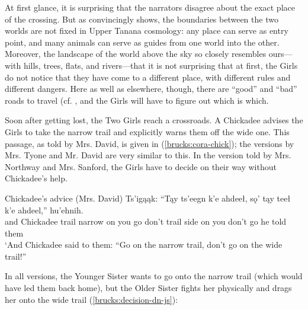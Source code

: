 At first glance, it is surprising that the narrators disagree about the exact place of the crossing. But as \citet[470f.]{GuedonMF2005} convincingly shows, the boundaries between the two worlds are not fixed in Upper Tanana cosmology: any place can serve as entry point, and many animals can serve as guides from one world into the other. Moreover, the landscape of the world above the sky so closely resembles ours—with hills, trees, flats, and rivers—that it is not surprising that at first, the Girls do not notice that they have come to a different place, with different rules and different dangers. Here as well as elsewhere, though, there are ``good'' and ``bad'' roads to travel (cf. \citet[473]{GuedonMF2005}, and the Girls will have to figure out which is which.

Soon after getting lost, the Two Girls reach a crossroads. A Chickadee advises the Girls to take the narrow trail and explicitly warns them off the wide one. This passage, as told by Mrs. David, is given in (\ref{brucks:cora-chick}); the versions by Mrs. Tyone and Mr. David are very similar to this. In the version told by Mrs. Northway and Mrs. Sanford, the Girls have to decide on their way without Chickadee's help.

\begin{exe}
\ex Chickadee's advice (Mrs. David) \label{brucks:cora-chick}
 Ts'igąąk: ``Tąy ts'eegn k'e ahdeeł, sǫ' tąy teeł k'e ahdeel,'' hu'ehnih. \\
 and Chickadee trail narrow on {you go} don't trail side on {you don't go} {he told them} \\
\glt `And Chickadee said to them: ``Go on the narrow trail, don't go on the wide trail!'' \\
\end{exe}

In all versions, the Younger Sister wants to go onto the narrow trail (which would have led them back home), but the Older Sister fights her physically and drags her onto the wide trail (\ref{brucks:decision-dn-js}):

